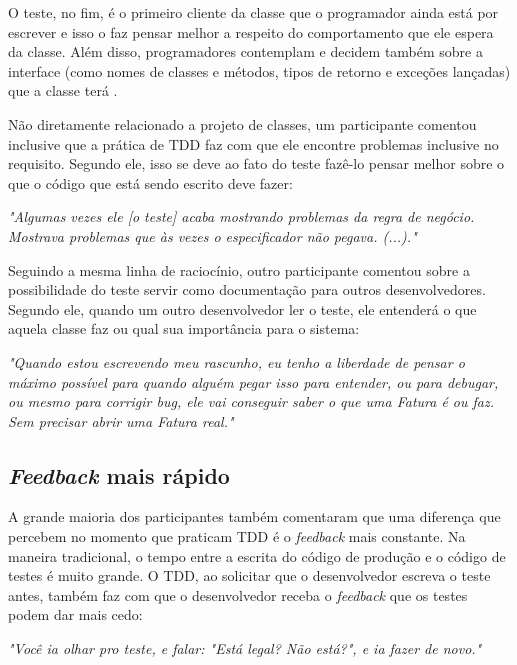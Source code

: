O teste, no fim, é o primeiro cliente da classe que o programador ainda está por escrever e 
isso o faz pensar melhor a respeito do comportamento que ele espera da classe. Além disso,
programadores contemplam e decidem também sobre a interface (como nomes de
classes e métodos, tipos de retorno e exceções lançadas) que a classe terá
\cite{janzen-saiedian}.

Não diretamente relacionado a projeto de classes, um participante comentou inclusive
que a prática de TDD faz com que ele encontre problemas inclusive no requisito. Segundo ele,
isso se deve ao fato do teste fazê-lo pensar melhor sobre o que o código que está 
sendo escrito deve fazer:

\begin{framed}
\textit{"Algumas vezes ele [o teste] acaba mostrando problemas da regra de negócio. Mostrava problemas
que às vezes o especificador não pegava. (...)."}
\end{framed}

Seguindo a mesma linha de raciocínio, outro participante comentou sobre a possibilidade
do teste servir como documentação para outros desenvolvedores. Segundo ele, quando um outro desenvolvedor
ler o teste, ele entenderá o que aquela classe faz ou qual sua importância para o sistema:

\begin{framed}
\textit{"Quando estou escrevendo meu rascunho, eu tenho a liberdade de pensar o máximo possível para quando alguém
pegar isso para entender, ou para debugar, ou mesmo para corrigir bug, ele vai conseguir saber o que uma Fatura é ou faz. Sem
precisar abrir uma Fatura real."}
\end{framed}

\subsection{\textit{Feedback} mais rápido}

A grande maioria dos participantes também comentaram que uma diferença que percebem
no momento que praticam TDD é o \textit{feedback} mais constante. Na maneira
tradicional, o tempo entre a escrita do código de produção e o código
de testes é muito grande. O TDD, ao solicitar que o desenvolvedor
escreva o teste antes, também faz com que o desenvolvedor receba o \textit{feedback} que
os testes podem dar mais cedo:

\begin{framed}
\textit{"Você ia olhar pro teste, e falar: "Está legal? Não está?", e ia fazer de novo."}
\end{framed}

